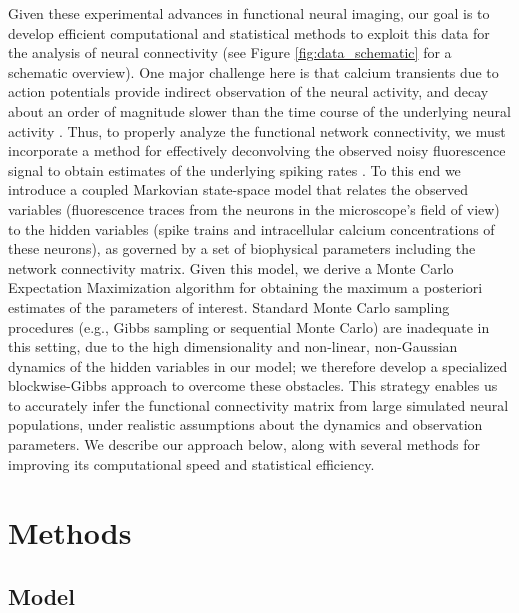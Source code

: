 \documentclass[aoas,preprint]{imsart}
\begin{document}
Given these experimental advances in functional neural imaging, our goal is to develop efficient computational and statistical methods to exploit this data for the analysis of neural connectivity (see Figure \ref{fig:data_schematic} for a schematic overview). One major challenge here is that calcium transients due to action potentials provide indirect observation of the neural activity, and decay about an order of magnitude slower than the time course of the underlying neural activity \cite{ImagingManual}. Thus, to properly analyze the functional network connectivity, we must incorporate a method for effectively deconvolving the observed noisy fluorescence signal to obtain estimates of the underlying spiking rates \cite{YaksiFriedrich06,GreenbergKerr08,Vogelstein2009}. To this end we introduce a coupled Markovian state-space model that relates the observed variables (fluorescence traces from the neurons in the microscope's field of view) to the hidden variables (spike trains and intracellular calcium concentrations of these neurons), as governed by a set of biophysical parameters including the network connectivity matrix. Given this model, we derive a Monte Carlo Expectation Maximization algorithm for obtaining the maximum a posteriori estimates of the parameters of interest. Standard Monte Carlo sampling procedures (e.g., Gibbs sampling or sequential Monte Carlo) are inadequate in this setting, due to the high dimensionality and non-linear, non-Gaussian dynamics of the hidden variables in our model; we therefore develop a specialized blockwise-Gibbs approach to overcome these obstacles. This strategy enables us to accurately infer the functional connectivity matrix from large simulated neural populations, under realistic assumptions about the dynamics and observation parameters. We describe our approach below, along with several methods for improving its computational speed and statistical efficiency.

\section{Methods}
\label{sec:methods}
\subsection{Model}
\label{sec:methods:markov-setup}
\end{document}
